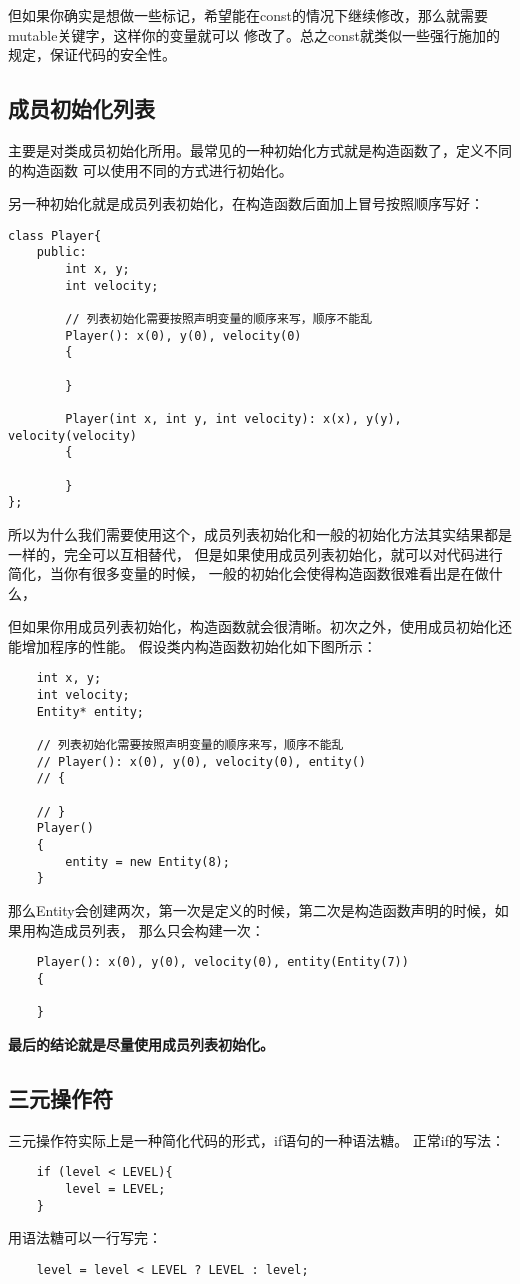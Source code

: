 \documentclass{article}
\begin{document}
\begin{sloppypar}
但如果你确实是想做一些标记，希望能在const的情况下继续修改，那么就需要mutable关键字，这样你的变量就可以
修改了。总之const就类似一些强行施加的规定，保证代码的安全性。

\subsection{成员初始化列表}
主要是对类成员初始化所用。最常见的一种初始化方式就是构造函数了，定义不同的构造函数
可以使用不同的方式进行初始化。

另一种初始化就是成员列表初始化，在构造函数后面加上冒号按照顺序写好：
\begin{lstlisting}
class Player{
    public:
        int x, y;
        int velocity;
        
        // 列表初始化需要按照声明变量的顺序来写，顺序不能乱
        Player(): x(0), y(0), velocity(0)
        {

        }

        Player(int x, int y, int velocity): x(x), y(y), velocity(velocity)
        {
            
        }
};
\end{lstlisting}
所以为什么我们需要使用这个，成员列表初始化和一般的初始化方法其实结果都是一样的，完全可以互相替代，
但是如果使用成员列表初始化，就可以对代码进行简化，当你有很多变量的时候，
一般的初始化会使得构造函数很难看出是在做什么，

但如果你用成员列表初始化，构造函数就会很清晰。初次之外，使用成员初始化还能增加程序的性能。
假设类内构造函数初始化如下图所示：
\begin{lstlisting}
	int x, y;
	int velocity;
	Entity* entity;
	
	// 列表初始化需要按照声明变量的顺序来写，顺序不能乱
	// Player(): x(0), y(0), velocity(0), entity()
	// {
	 
	// }
	Player()
	{
		entity = new Entity(8);
	}

\end{lstlisting}
那么Entity会创建两次，第一次是定义的时候，第二次是构造函数声明的时候，如果用构造成员列表，
那么只会构建一次：
\begin{lstlisting}
	Player(): x(0), y(0), velocity(0), entity(Entity(7))
	{
	 
	}
\end{lstlisting}
\textbf{最后的结论就是尽量使用成员列表初始化。}

\subsection{三元操作符}
三元操作符实际上是一种简化代码的形式，if语句的一种语法糖。 正常if的写法：
\begin{lstlisting}
	if (level < LEVEL){
        level = LEVEL;
    }
\end{lstlisting}
用语法糖可以一行写完：
\begin{lstlisting}
	level = level < LEVEL ? LEVEL : level;
\end{lstlisting}


\end{sloppypar}
\end{document}
